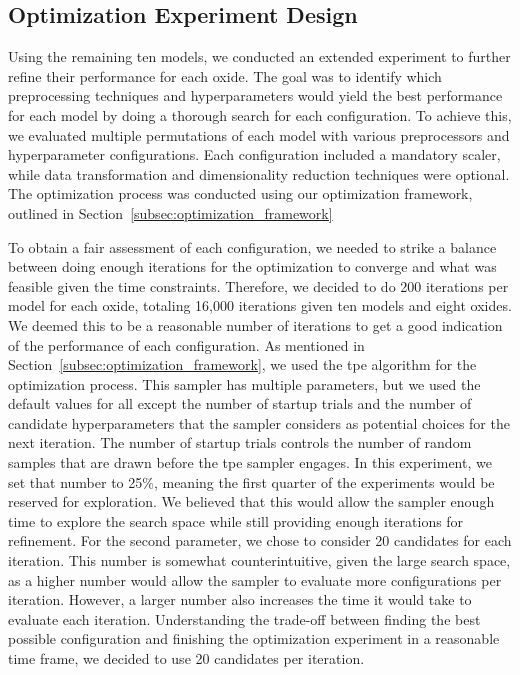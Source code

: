\subsection{Optimization Experiment Design}\label{subsec:optimization_experiment_design}
Using the remaining ten models, we conducted an extended experiment to further refine their performance for each oxide. 
The goal was to identify which preprocessing techniques and hyperparameters would yield the best performance for each model by doing a thorough search for each configuration. 
To achieve this, we evaluated multiple permutations of each model with various preprocessors and hyperparameter configurations. 
Each configuration included a mandatory scaler, while data transformation and dimensionality reduction techniques were optional. 
The optimization process was conducted using our optimization framework, outlined in Section~\ref{subsec:optimization_framework}

To obtain a fair assessment of each configuration, we needed to strike a balance between doing enough iterations for the optimization to converge and what was feasible given the time constraints. 
Therefore, we decided to do 200 iterations per model for each oxide, totaling 16,000 iterations given ten models and eight oxides. 
We deemed this to be a reasonable number of iterations to get a good indication of the performance of each configuration.
As mentioned in Section~\ref{subsec:optimization_framework}, we used the \gls{tpe} algorithm for the optimization process.
This sampler has multiple parameters, but we used the default values for all except the number of startup trials and the number of candidate hyperparameters that the sampler considers as potential choices for the next iteration. 
The number of startup trials controls the number of random samples that are drawn before the \gls{tpe} sampler engages. 
In this experiment, we set that number to 25\%, meaning the first quarter of the experiments would be reserved for exploration. 
We believed that this would allow the sampler enough time to explore the search space while still providing enough iterations for refinement. 
For the second parameter, we chose to consider 20 candidates for each iteration. 
This number is somewhat counterintuitive, given the large search space, as a higher number would allow the sampler to evaluate more configurations per iteration. 
However, a larger number also increases the time it would take to evaluate each iteration. 
Understanding the trade-off between finding the best possible configuration and finishing the optimization experiment in a reasonable time frame, we decided to use 20 candidates per iteration.

